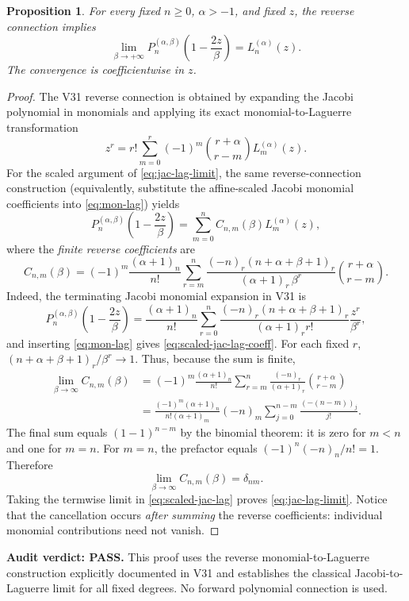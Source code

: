 \documentclass[11pt]{article}
\newtheorem{proposition}{Proposition}
\begin{document}
\begin{proposition}
For every fixed $n\ge0$, $\alpha>-1$, and fixed $z$, the reverse connection implies
\begin{equation}\label{eq:jac-lag-limit}
\lim_{\beta\to+\infty}P_n^{(\alpha,\beta)}\!\left(1-\frac{2z}{\beta}\right)=L_n^{(\alpha)}(z).
\end{equation}
The convergence is coefficientwise in $z$.
\end{proposition}
\begin{proof}
The V31 reverse connection is obtained by expanding the Jacobi polynomial in monomials and applying its exact monomial-to-Laguerre transformation
\begin{equation}\label{eq:mon-lag}
z^r=r!\sum_{m=0}^r(-1)^m\binom{r+\alpha}{r-m}L_m^{(\alpha)}(z).
\end{equation}
For the scaled argument of \eqref{eq:jac-lag-limit}, the same reverse-connection construction (equivalently, substitute the affine-scaled Jacobi monomial coefficients into \eqref{eq:mon-lag}) yields
\begin{equation}\label{eq:scaled-jac-lag}
P_n^{(\alpha,\beta)}\!\left(1-\frac{2z}{\beta}\right)
=\sum_{m=0}^n C_{n,m}(\beta)L_m^{(\alpha)}(z),
\end{equation}
where the \emph{finite reverse coefficients} are
\begin{equation}\label{eq:scaled-jac-lag-coeff}
C_{n,m}(\beta)=(-1)^m\frac{(\alpha+1)_n}{n!}
\sum_{r=m}^n\frac{(-n)_r(n+\alpha+\beta+1)_r}
{(\alpha+1)_r\,\beta^r}\binom{r+\alpha}{r-m}.
\end{equation}
Indeed, the terminating Jacobi monomial expansion in V31 is
\[
P_n^{(\alpha,\beta)}\!\left(1-\frac{2z}{\beta}\right)
=\frac{(\alpha+1)_n}{n!}\sum_{r=0}^n
\frac{(-n)_r(n+\alpha+\beta+1)_r}{(\alpha+1)_r r!}
\frac{z^r}{\beta^r},
\]
and inserting \eqref{eq:mon-lag} gives \eqref{eq:scaled-jac-lag-coeff}.
For each fixed $r$, $(n+\alpha+\beta+1)_r/\beta^r\to1$. Thus, because the sum is finite,
\begin{align*}
\lim_{\beta\to\infty}C_{n,m}(\beta)
&=(-1)^m\frac{(\alpha+1)_n}{n!}
\sum_{r=m}^n\frac{(-n)_r}{(\alpha+1)_r}
\binom{r+\alpha}{r-m}\\
&=\frac{(-1)^m(\alpha+1)_n}{n!(\alpha+1)_m}
(-n)_m\sum_{j=0}^{n-m}\frac{(-(n-m))_j}{j!}.
\end{align*}
The final sum equals $(1-1)^{n-m}$ by the binomial theorem: it is zero for $m<n$ and one for $m=n$. For $m=n$, the prefactor equals
$(-1)^n(-n)_n/n!=1$. Therefore
\[
\lim_{\beta\to\infty}C_{n,m}(\beta)=\delta_{nm}.
\]
Taking the termwise limit in \eqref{eq:scaled-jac-lag} proves \eqref{eq:jac-lag-limit}. Notice that the cancellation occurs \emph{after summing} the reverse coefficients: individual monomial contributions need not vanish.
\end{proof}
\noindent\textbf{Audit verdict: PASS.} This proof uses the reverse monomial-to-Laguerre construction explicitly documented in V31 and establishes the classical Jacobi-to-Laguerre limit for all fixed degrees. No forward polynomial connection is used.
\end{document}
